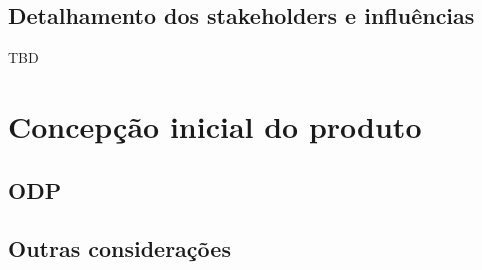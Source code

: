 \subsection{Detalhamento dos stakeholders e influências}
TBD

\section{Concepção inicial do produto}
\subsection{ODP}
\subsection{Outras considerações}

